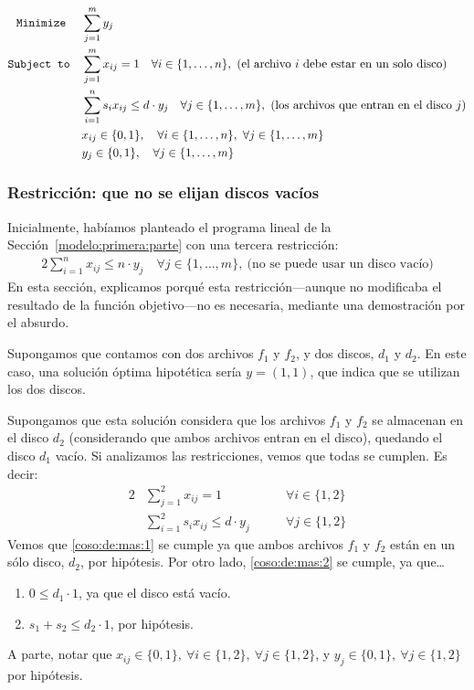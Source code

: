 \documentclass[11pt, a4paper, pdftex]{article}
\begin{document}
\begin{alignat*}{2}
	\texttt{Minimize}\quad\,\,
	& \sum_{j = 1}^{m} y_{j}\\
	\texttt{Subject to}\quad
	& \sum_{j = 1}^{m} x_{ij} = 1 \quad \forall i \in \{1, \ldots, n\},\ \text{(el archivo $i$ debe estar en un solo disco)}\\
	& \sum_{i = 1}^{n} s_{i} x_{ij} \le d\cdot y_{j} \quad \forall j \in \{1, \ldots, m\},\ \text{(los archivos que entran en el disco $j$)}\\
	& x_{ij} \in \{0,1\}, \quad \forall i \in \{1, \ldots, n\}, \ \forall j \in \{1, \ldots, m\}\\
	& y_{j} \in \{0,1\}, \quad \forall j \in \{1, \ldots, m\}
\end{alignat*}

\subsubsection{Restricción: que no se elijan discos vacíos}

Inicialmente, habíamos planteado el programa lineal de la
Sección~\ref{modelo:primera:parte} con una tercera restricción:
\begin{alignat*}{2}
    \sum_{i = 1}^{n} x_{ij} \le n\cdot y_{j} \quad \forall j \in \{1,
	\ldots, m\},\ \text{(no se puede usar un disco vacío)}
\end{alignat*}
En esta sección, explicamos porqué esta restricción---aunque no
modificaba el resultado de la función objetivo---no es necesaria,
mediante una demostración por el absurdo.

Supongamos que contamos con dos archivos $f_{1}$ y $f_{2}$, y dos
discos, $d_{1}$ y $d_{2}$. En este caso, una solución óptima hipotética
sería $y = (1, 1)$, que indica que se utilizan los dos discos.

Supongamos que esta solución considera que los archivos $f_{1}$ y
$f_{2}$ se almacenan en el disco $d_{2}$ (considerando que ambos
archivos entran en el disco), quedando el disco $d_{1}$ vacío. Si
analizamos las restricciones, vemos que todas se cumplen. Es decir:
\begin{alignat}{2}
	& \sum_{j = 1}^{2} x_{ij} = 1                     & \qquad \forall i \in \{1, 2\}\label{coso:de:mas:1}\\
	& \sum_{i = 1}^{2} s_{i} x_{ij} \le d \cdot y_{j} & \qquad \forall j \in \{1, 2\}\label{coso:de:mas:2}
\end{alignat}
Vemos que \eqref{coso:de:mas:1} se cumple ya que ambos archivos $f_{1}$ y
$f_{2}$ están en un sólo disco, $d_{2}$, por hipótesis. Por otro lado,
\eqref{coso:de:mas:2} se cumple, ya que\ldots
\begin{enumerate}
	\item $0 \leq d_{1} \cdot 1$, ya que el disco está vacío.
	\item $s_{1} + s_{2} \leq d_{2} \cdot 1$, por hipótesis.
\end{enumerate}
A parte, notar que $x_{ij} \in \{0,1\},\ \forall i \in \{1, 2\},\ \forall j \in \{1, 2\}$,
y $y_{j} \in \{0,1\},\ \forall j \in \{1, 2\}$ por hipótesis. %
\end{document}
